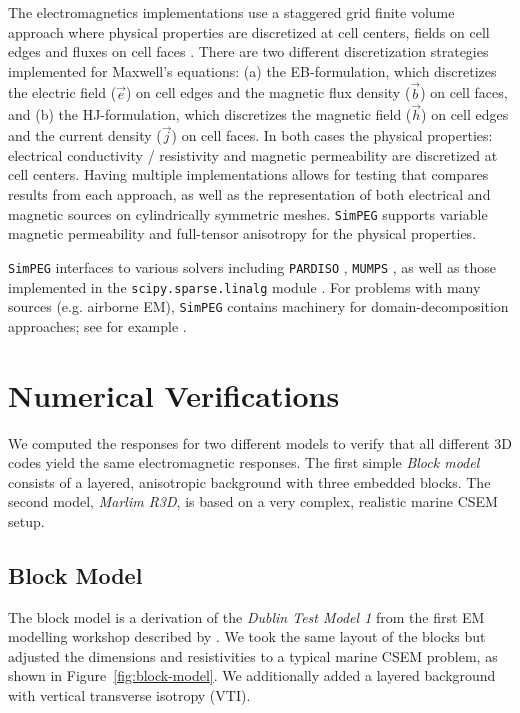 \documentclass[
    paper,
  ]{geophysics}
\newcommand{\simpeg}{\texttt{SimPEG}\xspace}
\begin{document}
The electromagnetics implementations use a staggered grid finite volume approach where physical properties are discretized at cell centers, fields on cell edges and fluxes on cell faces \citep{IEEE.66.Yee}.
There are two different discretization strategies implemented for Maxwell's equations: (a) the EB-formulation, which discretizes the electric field ($\vec{e}$) on cell edges and the magnetic flux density ($\vec{b}$) on cell faces, and (b) the HJ-formulation, which discretizes the magnetic field ($\vec{h}$) on cell edges and the current density ($\vec{j}$) on cell faces. In both cases the physical properties: electrical conductivity / resistivity and magnetic permeability are discretized at cell centers. Having multiple implementations allows for testing that compares results from each approach, as well as the representation of both electrical and magnetic sources on cylindrically symmetric meshes. \simpeg supports variable magnetic permeability and full-tensor anisotropy for the physical properties.

\simpeg interfaces to various solvers including \texttt{PARDISO} \citep{FGCS.04.Schenk}, \texttt{MUMPS} \citep{SIAM.01.Amestoy}, as well as those implemented in the \texttt{scipy.sparse.linalg} module \citep{NM.20.Virtanen}. For problems with many sources (e.g. airborne EM), \simpeg contains machinery for domain-decomposition approaches; see for example \cite{GEO.20.Fournier}.


\section{Numerical Verifications}

We computed the responses for two different models to verify that all different 3D codes yield the same electromagnetic responses. The first simple \emph{Block model} consists of a layered, anisotropic background with three embedded blocks. The second model, \emph{Marlim R3D}, is based on a very complex, realistic marine CSEM setup.

\subsection{Block Model}

The block model is a derivation of the \emph{Dublin Test Model 1} from the first EM modelling workshop described by \cite{GJI.13.Miensopust}. We took the same layout of the blocks but adjusted the dimensions and resistivities to a typical marine CSEM problem, as shown in Figure~\ref{fig:block-model}. We additionally added a layered background with vertical transverse isotropy (VTI).
%
%
\end{document}
